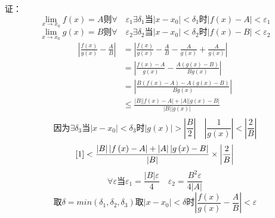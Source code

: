 \documentclass{article}
\begin{document}
证：
\[
  \lim_{x \rightarrow x_0}{f\left( x \right)}=A \text{则} \forall \quad \varepsilon_1 \exists \delta_1 \text{当} \left| x - x_0 \right|<\delta_1 \text{时} \left| f\left( x \right)-A \right|<\varepsilon_1
\]
\[
  \lim_{x \rightarrow x_0}{g\left( x \right)}=B \text{则} \forall \quad \varepsilon_2 \exists \delta_2 \text{当} \left| x - x_0 \right|<\delta_2 \text{时} \left| f\left( x \right)-B \right|<\varepsilon_2
\]
\begin{align*}
  \left| \frac{f\left( x \right)}{g\left( x \right)}-\frac{A}{B} \right| &= \left| \frac{f\left( x \right)}{g\left( x \right)}-\frac{A}{B}-\frac{A}{g\left( x \right)}+\frac{A}{g\left(x\right)} \right| \\
  & =\left| \frac{f\left( x \right)-A}{g\left( x \right)}-\frac{A\left( g\left( x \right)-B \right)}{Bg\left( x \right)} \right| \\
  & =\left| \frac{B\left( f\left( x \right)-A \right)-A\left( g\left( x \right)-B \right)}{Bg\left( x \right)} \right| \\
  & \leq\frac{\left| B \right|\left| f\left( x \right)-A \right|+\left| A \right|\left| g\left(x\right)-B \right|}{\left|B\right|\left|g\left(x\right)\right|} \tag*{(1)}\label{1} \\
\end{align*}
\[
  \text{因为} \exists \delta_3 \text{当} \left|x-x_0\right|<\delta_3 \text{时} \left| g\left(x\right)\right|>\left|\frac{B}{2}\right| \quad \left|\frac{1}{g\left(x\right)}\right|<\left|\frac{2}{B}\right|
\]
\[
  \ref{1} < \frac{\left|B\right|\left|f\left(x\right)-A\right|+\left|A\right|\left|g\left(x\right)-B\right|}{\left|B\right|}\times\left|\frac{2}{B}\right|
\]
\[
  \forall \varepsilon \text{当} \varepsilon_1=\frac{\left|B\right|\varepsilon}{4} \quad \varepsilon_2=\frac{B^{2}\varepsilon}{4\left|A\right|}
\]
\[
  \text{取} \delta=min\left(\delta_1,\delta_2,\delta_3\right) \text{取} \left|x-x_0\right|<\delta \text{时} \left|\frac{f\left(x\right)}{g\left(x\right)}-\frac{A}{B}\right|<\varepsilon
\]
\end{document}
